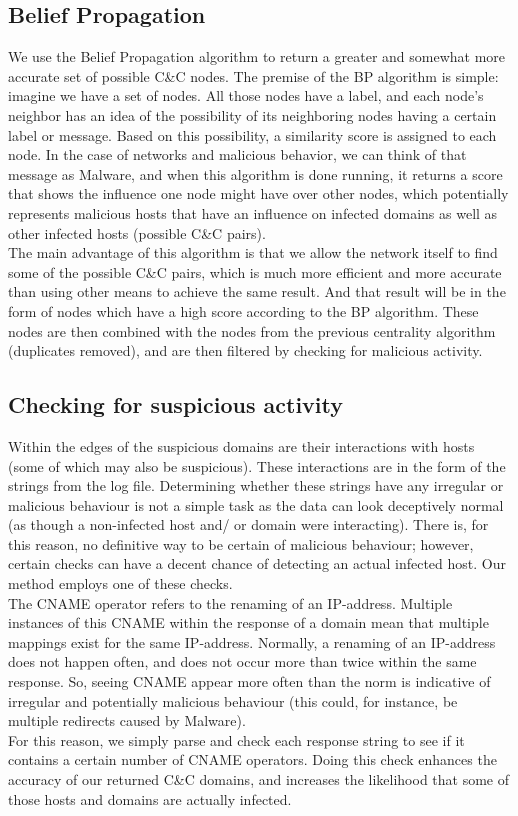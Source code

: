 \documentclass{article} %
\begin{document}
\subsection{Belief Propagation}
We use the Belief Propagation algorithm to return a greater and somewhat more accurate set of possible C\&C nodes.
The premise of the BP algorithm is simple: imagine we have a set of nodes. All those nodes have a label, and each node's neighbor has an idea of the possibility of its neighboring nodes having a certain label or message. Based on this 
possibility, a similarity score is assigned to each node. In the case of networks and malicious behavior, we can think of that message as Malware, and when this algorithm is done running, it returns a score that shows the influence one 
node might have over other nodes, which potentially represents malicious hosts that have an influence on infected domains as well as other infected hosts (possible C\&C pairs). \\
The main advantage of this algorithm is that we allow the network itself to find some of the possible C\&C pairs, which is much more efficient and more accurate than using other means to achieve the same result. And that result will be in
the form of nodes which have a high score according to the BP algorithm. These nodes are then combined with the nodes from the previous centrality algorithm (duplicates removed), and are then filtered by checking for malicious activity.

\subsection{Checking for suspicious activity}
Within the edges of the suspicious domains are their interactions with hosts (some of which may also be suspicious). These interactions are in the form of the strings from the log file. Determining whether these strings have any irregular or
malicious behaviour is not a simple task as the data can look deceptively normal (as though a non-infected host and/ or domain were interacting). There is, for this reason, no definitive way to be certain of malicious behaviour; however, 
certain checks can have a decent chance of detecting an actual infected host. Our method employs one of these checks. \\
The CNAME operator refers to the renaming of an IP-address. Multiple instances of this CNAME within the response of a domain mean that multiple mappings exist for the same IP-address. Normally, a renaming of an IP-address does not happen often,
and does not occur more than twice within the same response. So, seeing CNAME appear more often than the norm is indicative of irregular and potentially malicious behaviour (this could, for instance, be multiple redirects caused by Malware). \\
For this reason, we simply parse and check each response string to see if it contains a certain number of CNAME operators.
Doing this check enhances the accuracy of our returned C\&C domains, and increases the likelihood that some of those hosts and domains are actually infected. 
\end{document}
